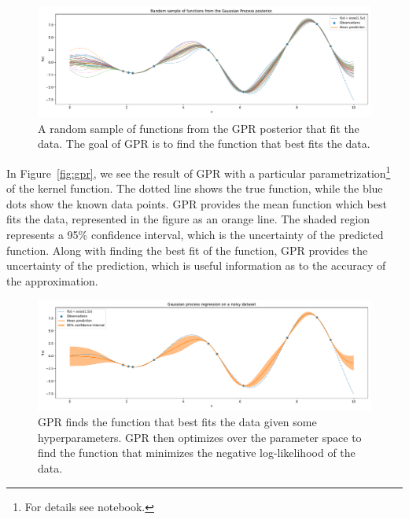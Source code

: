 \begin{figure}
  \centering
  \includegraphics[width=\linewidth]{Figures/gpr_sample.pdf}
  \caption{A random sample of functions from the GPR posterior that fit the data. The goal of GPR is to find the function that best fits the data.}
  \notinsubfile{\label{fig:gpr_sample}}
\end{figure}

In Figure~\ref{fig:gpr}, we see the result of GPR with a particular parametrization\footnote{For details see notebook.} of the kernel function. The dotted line shows the true function, while the blue dots show the known data points. GPR provides the mean function which best fits the data, represented in the figure as an orange line. The shaded region represents a 95\% confidence interval, which is the uncertainty of the predicted function. Along with finding the best fit of the function, GPR provides the uncertainty of the prediction, which is useful information as to the accuracy of the approximation.

\begin{figure}
  \centering
  \includegraphics[width=\linewidth]{Figures/gpr.pdf}
  \caption{GPR finds the function that best fits the data given some hyperparameters. GPR then optimizes over the parameter space to find the function that minimizes the negative log-likelihood of the data.}
  \notinsubfile{\label{fig:gpr}}
\end{figure}
